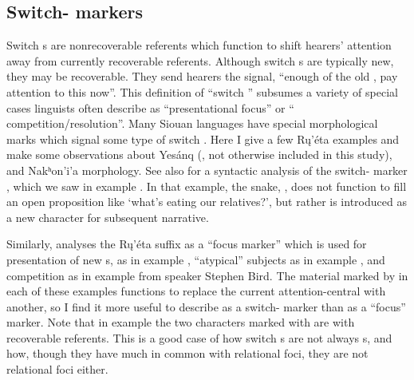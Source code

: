 \documentclass[output=paper]{LSP/langsci}
\begin{document}
\subsection{Switch- markers}\label{switchtopic}

	Switch s are nonrecoverable referents which function to shift hearers’ attention away from currently recoverable referents. Although switch s are typically new, they may be recoverable. They send hearers the signal, “enough of the old , pay attention to this now”. This definition of “switch ” subsumes a variety of special cases linguists often describe as “presentational focus” or “ competition/resolution”. Many Siouan languages have special morphological marks which signal some type of switch . Here I give a few Rų’éta examples and make some observations about Yesánq (, not otherwise included in this study),  and Nakʰon’i’a morphology. See also \citet[288--293]{Boyle2007} for a syntactic analysis of the  switch- marker , which we saw in example . In that example, the snake, , does not function to fill an open proposition like `what’s eating our relatives?', but rather is introduced as a new character for subsequent narrative.
	
	Similarly, \citet{Wolvengrey1991} analyses the Rų’éta suffix  as a “focus marker” which is used for presentation of new s, as in example , “atypical” subjects as in example , and  competition as in example  from speaker Stephen Bird. The material marked by  in each of these examples functions to replace the current attention-central   with another, so I find it more useful to describe  as a switch- marker than as a “focus” marker. Note that in example  the two characters marked with  are  with recoverable referents. This is a good case of how switch s are not always  s, and how, though they have much in common with relational foci, they are not relational foci either.
\end{document}

